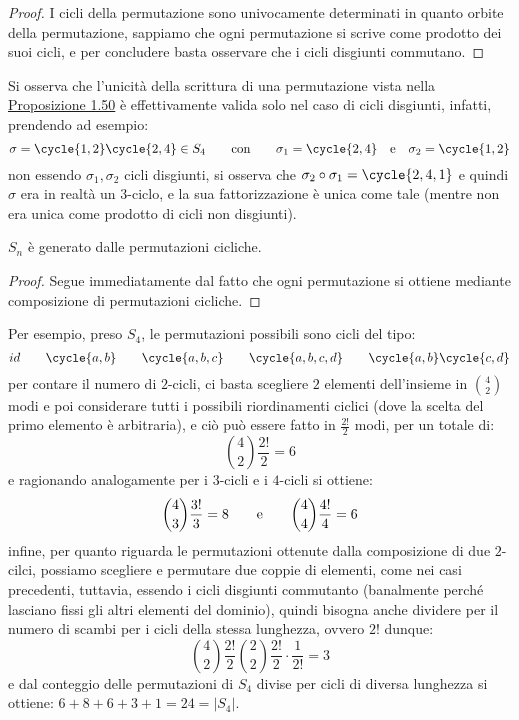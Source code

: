 \documentclass[11pt]{scrartcl}
\begin{document}
\begin{proof}
    I cicli della permutazione sono univocamente determinati in quanto orbite della permutazione, sappiamo che ogni permutazione si scrive come prodotto dei suoi cicli,
    e per concludere basta osservare che i cicli disgiunti commutano.
\end{proof}

\begin{remark}
    Si osserva che l'unicità della scrittura di una permutazione vista nella \hyperref[perm]{Proposizione 1.50} è effettivamente valida solo nel caso di cicli disgiunti, infatti, prendendo ad esempio:
        \[ \sigma = \cycle{1,2}\cycle{2,4} \in S_4 \qquad \text{con}\qquad \sigma_1 = \cycle{2,4} \quad \text e \quad \sigma_2 = \cycle{1,2}
            \]
    non essendo $\sigma_1,\sigma_2$ cicli disgiunti, si osserva che $\sigma_2 \circ \sigma_1 = \cycle{2,4,1}$ e quindi $\sigma$ era in realtà un $3$-ciclo, e la sua fattorizzazione è unica come tale 
    (mentre non era unica come prodotto di cicli non disgiunti). 
\end{remark}

\pagebreak

\begin{corollary}
    $S_n$ è generato dalle permutazioni cicliche.
\end{corollary}

\begin{proof}
    Segue immediatamente dal fatto che ogni permutazione si ottiene mediante composizione di permutazioni cicliche. 
\end{proof}

\begin{example}
    Per esempio, preso $S_4$, le permutazioni possibili sono cicli del tipo:
        \[ id \qquad \cycle{a,b} \qquad \cycle{a,b,c} \qquad \cycle{a,b,c,d} \qquad \cycle{a,b}\cycle{c,d}
            \]
    per contare il numero di $2$-cicli, ci basta scegliere $2$ elementi dell'insieme in $\binom{4}{2}$ modi e poi considerare tutti i possibili 
    riordinamenti ciclici (dove la scelta del primo elemento è arbitraria), e ciò può essere fatto in $\frac{2!}{2}$ modi, per un totale di:
        \[ \binom{4}{2}\frac{2!}{2} = 6
            \]
    e ragionando analogamente per i $3$-cicli e i $4$-cicli si ottiene:
        \[ \binom{4}{3}\frac{3!}{3} = 8 \qquad \text e \qquad \binom{4}{4}\frac{4!}{4} = 6
            \]
    infine, per quanto riguarda le permutazioni ottenute dalla composizione di due $2$-cilci, possiamo scegliere e permutare due coppie di elementi, come 
    nei casi precedenti, tuttavia, essendo i cicli disgiunti commutanto (banalmente perché lasciano fissi gli altri elementi del dominio), quindi bisogna anche 
    dividere per il numero di scambi per i cicli della stessa lunghezza, ovvero $2!$ dunque:
        \[ \binom{4}{2}\frac{2!}{2}\binom{2}{2}\frac{2!}{2} \cdot \frac{1}{2!} = 3
            \]
    e dal conteggio delle permutazioni di $S_4$ divise per cicli di diversa lunghezza si ottiene: $6+8+6+3+1 = 24 = |S_4|$.
\end{example}
\end{document}
